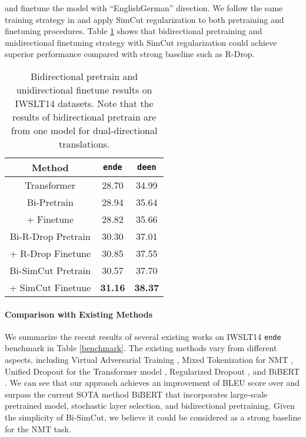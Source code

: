 \documentclass[11pt]{article}
\begin{document}
and finetune the model with ``EnglishGerman'' direction. We follow the same training strategy in \citet{ding2021improving} and apply SimCut regularization to both pretraining and finetuning procedures. Table \ref{bit} shows that bidirectional pretraining and unidirectional finetuning strategy with SimCut regularization could achieve superior performance compared with strong baseline such as R-Drop.  

\begin{table}
\centering
\begin{tabular}{c|c|c}
\hline
Method & \texttt{en}\texttt{de} & \texttt{de}\texttt{en} \\
\hline\hline
Transformer & 28.70 & 34.99 \\
\hline
Bi-Pretrain & 28.94 & 35.64 \\
+ Finetune & 28.82 & 35.66 \\
\hline
Bi-R-Drop Pretrain & 30.30 & 37.01 \\
+ R-Drop Finetune & 30.85 & 37.55 \\
\hline
Bi-SimCut Pretrain & 30.57 & 37.70 \\
+ SimCut Finetune & \bf 31.16 & \bf 38.37 \\
\end{tabular}
\caption{Bidirectional pretrain and unidirectional finetune results on IWSLT14  datasets. Note that the results of bidirectional pretrain are from one model for dual-directional translations. \label{bit}}
\end{table}


\paragraph{Comparison with Existing Methods}

We summarize the recent results of several existing works on IWSLT14 \texttt{en}\texttt{de} benchmark in Table \ref{benchmark}. The existing methods vary from different aspects, including Virtual Adversarial Training \cite{sano2019effective}, Mixed Tokenization for NMT \cite{wu2020sequence}, Unified Dropout for the Transformer model \cite{wu2021unidrop}, Regularized Dropout \cite{liang2021r}, and BiBERT \cite{xu-etal-2021-bert}. We can see that our approach achieves an improvement of  BLEU score over \citet{vaswani2017attention} and surpass the current SOTA method BiBERT that incorporates large-scale pretrained model, stochastic layer selection, and bidirectional pretraining. Given the simplicity of Bi-SimCut, we believe it could be considered as a strong baseline for the NMT task.
\end{document}
